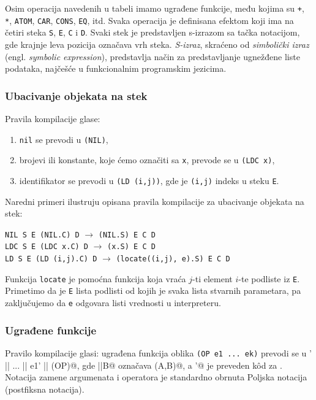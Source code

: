 Osim operacija navedenih u tabeli imamo ugrađene funkcije, među kojima su \verb|+|, \verb|*|, \verb|ATOM|, \verb|CAR|, \verb|CONS|, \verb|EQ|, itd. Svaka operacija je definisana efektom koji ima na četiri steka \verb|S|, \verb|E|, \verb|C| i \verb|D|. Svaki stek je predstavljen s-izrazom sa tačka notacijom, gde krajnje leva pozicija označava vrh steka. \textit{S-izraz}, skraćeno od \textit{simbolički izraz} (engl. \textit{symbolic expression}), predstavlja način za predstavljanje ugnežđene liste podataka, najčešće u funkcionalnim programskim jezicima.

\subsubsection{Ubacivanje objekata na stek}

Pravila kompilacije glase:

\begin{enumerate}
	\item \verb|nil| se prevodi u \verb|(NIL)|,
	\item brojevi ili konstante, koje ćemo označiti sa \verb|x|, prevode se u \verb|(LDC x)|,
	\item identifikator se prevodi u \verb|(LD (i,j))|, gde je \verb|(i,j)| indeks u steku \verb|E|.
\end{enumerate}

\begin{primer} Naredni primeri ilustruju opisana pravila kompilacije za ubacivanje objekata na stek:
	\begin{center}
		\verb|NIL S E (NIL.C) D| $\rightarrow$ \verb|(NIL.S) E C D|\\
		\verb|LDC S E (LDC x.C) D| $\rightarrow$ \verb|(x.S) E C D|\\
		\verb|LD S E (LD (i,j).C) D| $\rightarrow$ \verb|(locate((i,j), e).S) E C D|
	\end{center}
\end{primer}

Funkcija \verb|locate| je pomoćna funkcija koja vraća $j$-ti element $i$-te podliste iz \verb|E|. Primetimo da je \verb|E| lista podlisti od kojih je svaka lista stvarnih parametara, pa zaključujemo da \verb|e| odgovara listi vrednosti u interpreteru.

\subsubsection{Ugrađene funkcije}

Pravilo kompilacije glasi: ugrađena funkcija oblika \verb|(OP e1 ... ek)| prevodi se u \verb@ek' || ... || e1' || (OP)@, gde \verb@A||B@ označava \verb@append(A,B)@, a \verb@ei'@ je preveden k\^od za \verb@ei@. Notacija zamene argumenata i operatora je standardno obrnuta Poljska notacija (postfiksna notacija).

